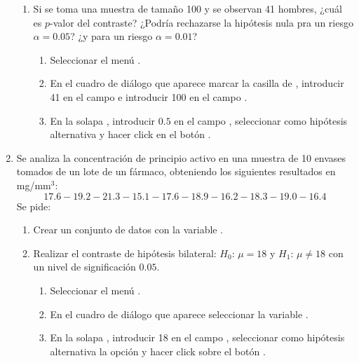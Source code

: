 \begin{enumerate}[leftmargin=*]
\begin{enumerate}
\item Si se toma una muestra de tamaño 100 y se observan 41 hombres, ¿cuál es $p$-valor del contraste? 
¿Podría rechazarse la hipótesis nula pra un riesgo $\alpha=0.05$? 
¿y para un riesgo $\alpha=0.01$?
\begin{indicacion}{
\begin{enumerate}
\item Seleccionar el menú .
\item En el cuadro de diálogo que aparece marcar la casilla de , introducir
41 en el campo  e introducir 100 en el campo .
\item En la solapa , introducir $0.5$ en el campo , seleccionar
como hipótesis alternativa  y hacer click en el botón .
\end{enumerate}}
\end{indicacion}
\end{enumerate}


\item  Se analiza la concentración de principio activo en una muestra de 10 envases tomados de un lote de un fármaco, obteniendo los
siguientes resultados en mg/mm$^{3}$: 
\[ 
17.6-19.2-21.3-15.1-17.6-18.9-16.2-18.3-19.0-16.4 
\]
Se pide:
\begin{enumerate}
\item Crear un conjunto de datos con la variable .

\item Realizar el contraste de hipótesis bilateral: $H_0$: $\mu=18$ y $H_1$: $\mu\neq18$ con un nivel de significación
$0.05$.
\begin{indicacion}{
\begin{enumerate}
\item Seleccionar el menú .
\item En el cuadro de diálogo que aparece seleccionar la variable .
\item En la solapa , introducir 18 en el campo , seleccionar como
hipótesis alternativa la opción  y hacer click sobre el botón .
\end{enumerate}}
\end{indicacion}


\end{enumerate}
\end{enumerate}
